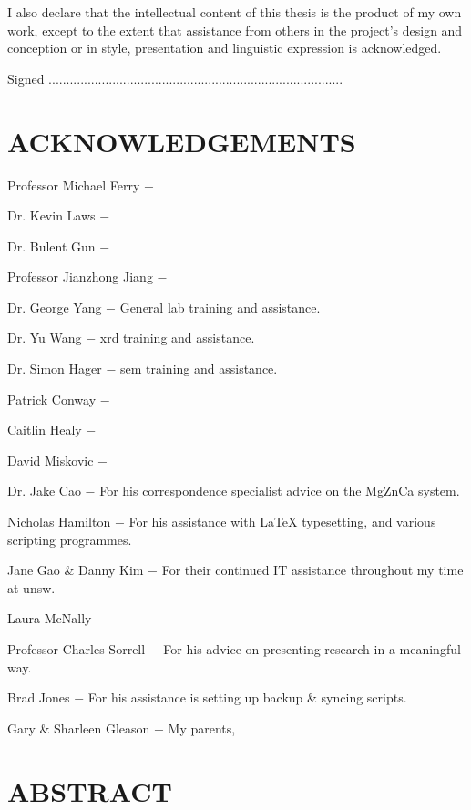 \documentclass[a4paper,12pt,oneside]{report}%
\begin{document}
I also declare that the intellectual content of this thesis is the product of my own work,
except to the extent that assistance from others in the project’s design and conception
or in style, presentation and linguistic expression is acknowledged.

\vspace{2cm}

Signed ...................................................................................



\chapter*{ACKNOWLEDGEMENTS}

Professor Michael Ferry $-$ 

Dr. Kevin Laws $-$ 

Dr. Bulent Gun $-$ 

Professor Jianzhong Jiang $-$

Dr. George Yang $-$ General lab training and assistance.

Dr. Yu Wang $-$ \acrshort{xrd} training and assistance.

Dr. Simon Hager $-$ \acrshort{sem} training and assistance.

Patrick Conway $-$ 

Caitlin Healy $-$ 

David Miskovic $-$ 

Dr. Jake Cao $-$ For his correspondence specialist advice on the MgZnCa system.

Nicholas Hamilton $-$ For his assistance with \LaTeX{} typesetting, and various scripting programmes.

Jane Gao \& Danny Kim $-$ For their continued IT assistance throughout my time at \acrshort{unsw}.

Laura McNally $-$

Professor Charles Sorrell $-$ For his advice on presenting research in a meaningful way.

Brad Jones $-$ For his assistance is setting up backup \& syncing scripts.

Gary \& Sharleen Gleason $-$ My parents, 


\chapter*{ABSTRACT}
\end{document}
